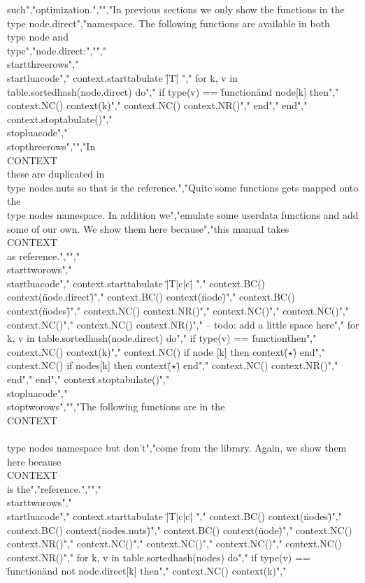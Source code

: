 such","optimization.","","In previous sections we only show the functions in the \\type {node.direct}","namespace. The following functions are available in both \\type {node} and \\type","{node.direct}:","","\\startthreerows","\\startluacode","    context.starttabulate { \"|T|\" }","    for k, v in table.sortedhash(node.direct) do","        if type(v) == \"function\" and node[k] then","            context.NC() context(k)","            context.NC() context.NR()","        end","    end","    context.stoptabulate()","\\stopluacode","\\stopthreerows","","In \\CONTEXT\\ these are duplicated in \\type {nodes.nuts} so that is the reference.","Quite some functions gets mapped onto the \\type {nodes} namespace. In addition we","emulate some userdata functions and add some of our own. We show them here because","this manual takes \\CONTEXT\\ as reference.","","\\starttworows","\\startluacode","    context.starttabulate { \"|T|c|c|\" }","        context.BC() context(\"node.direct\")","        context.BC() context(\"node\")","        context.BC() context(\"nodes\")","        context.NC() context.NR()","        context.NC()","        context.NC()","        context.NC()","        context.NC() context.NR()","        -- todo: add a little space here","        for k, v in table.sortedhash(node.direct) do","            if type(v) == \"function\" then","                context.NC() context(k)","                context.NC() if node [k] then context(\"$⋆$\") end","                context.NC() if nodes[k] then context(\"$⋆$\") end","                context.NC() context.NR()","            end","        end","    context.stoptabulate()","\\stopluacode","\\stoptworows","","The following functions are in the \\CONTEXT\\ \\type {nodes} namespace but don't","come from the library. Again, we show them here because \\CONTEXT\\ is the","reference.","","\\starttworows","\\startluacode","    context.starttabulate { \"|T|c|c|\" }","        context.BC() context(\"nodes\")","        context.BC() context(\"nodes.nuts\")","        context.BC() context(\"node\")","        context.NC() context.NR()","        context.NC()","        context.NC()","        context.NC()","        context.NC() context.NR()","        for k, v in table.sortedhash(nodes) do","            if type(v) == \"function\" and not node.direct[k] then","                context.NC() context(k)","     